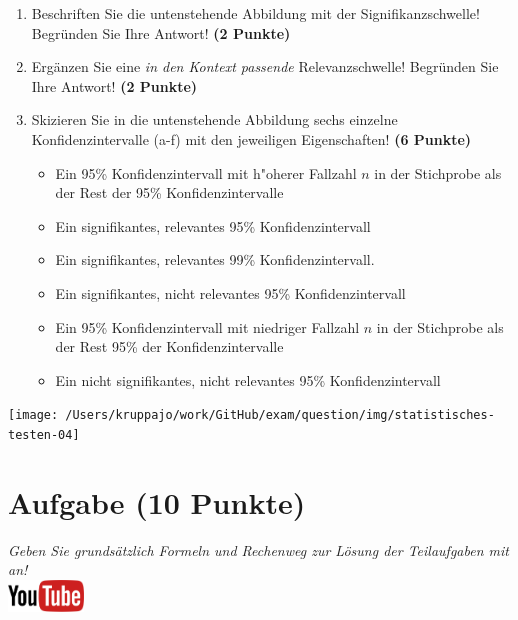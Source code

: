 \documentclass[a4paper, 9pt]{scrartcl}\usepackage[]{graphicx}\usepackage[]{xcolor}
\begin{document}
\begin{enumerate}
\item Beschriften Sie die untenstehende Abbildung mit der
  Signifikanzschwelle! Begr{\"u}nden Sie Ihre Antwort! \textbf{(2 Punkte)}
\item Erg{\"a}nzen Sie eine \textit{in den Kontext passende} Relevanzschwelle!
  Begr{\"u}nden Sie Ihre Antwort! \textbf{(2 Punkte)} 
\item Skizieren Sie in die
  untenstehende Abbildung sechs einzelne Konfidenzintervalle (a-f) mit den
  jeweiligen Eigenschaften! \textbf{(6 Punkte)}
  \begin{itemize}
  \item[(a)] Ein 95\% Konfidenzintervall mit h{"o}herer Fallzahl $n$ in der Stichprobe als der Rest der 95\% Konfidenzintervalle 	
  \item[(b)] Ein signifikantes, relevantes 95\% Konfidenzintervall 	
  \item[(c)] Ein signifikantes, relevantes 99\% Konfidenzintervall. 	
  \item[(d)] Ein signifikantes, nicht relevantes 95\% Konfidenzintervall 
  \item[(e)] Ein 95\% Konfidenzintervall mit niedriger Fallzahl $n$ in der Stichprobe als der Rest 95\% der Konfidenzintervalle
  \item[(f)] Ein nicht signifikantes, nicht relevantes 95\% Konfidenzintervall
  \end{itemize}
\end{enumerate}

\begin{center}
  \texttt{[image: /Users/kruppajo/work/GitHub/exam/question/img/statistisches-testen-04]}
\end{center}


 
\clearpage

\section{Aufgabe \hfill (10 Punkte)}

\textit{Geben Sie grunds{\"a}tzlich Formeln und Rechenweg zur L{\"o}sung der
  Teilaufgaben mit an!} \\[1Ex]

\hfill\href{https://youtu.be/FgZmpnEWDag}{\includegraphics[width =
  2cm]{img/youtube}}\\[1Ex]
\end{document}
